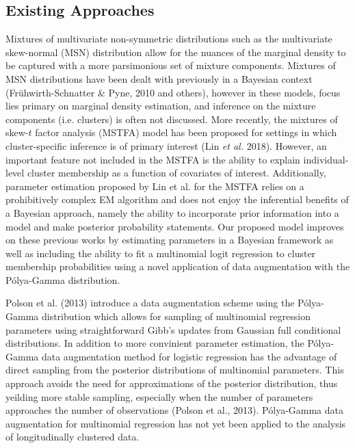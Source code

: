 \documentclass[useAMS,referee]{biom}
\begin{document}
\subsection{Existing Approaches}

Mixtures of multivariate non-symmetric distributions such as the multivariate skew-normal (MSN) distribution allow for the nuances of the marginal density to be captured with a more parsimonious set of mixture components. Mixtures of MSN distributions have been dealt with previously in a Bayesian context (Fr\"{u}hwirth-Schnatter \& Pyne, 2010 and others), however in these models, focus lies primary on marginal density estimation, and inference on the mixture components (i.e. clusters) is often not discussed. More recently, the mixtures of skew-$t$ factor analysis (MSTFA) model has been proposed for settings in which cluster-specific inference is of primary interest (Lin \textit{et al.} 2018). However, an important feature not included in the MSTFA is the ability to explain individual-level cluster membership as a function of covariates of interest. Additionally, parameter estimation proposed by Lin et al. for the MSTFA relies on a prohibitively complex EM algorithm and does not enjoy the inferential benefits of a Bayesian approach, namely the ability to incorporate prior information into a model and make posterior probability statements. Our proposed model improves on these previous works by estimating parameters in a Bayesian framework as well as including the ability to fit a multinomial logit regression to cluster membership probabilities using a novel application of data augmentation with the P\'olya-Gamma distribution.

Polson et al. (2013) introduce a data augmentation scheme using the P\'olya-Gamma distribution which allows for sampling of multinomial regression parameters using straightforward Gibb's updates from Gaussian full conditional distributions. In addition to more convinient parameter estimation, the P\'olya-Gamma data augmentation method for logistic regression has the advantage of direct sampling from the posterior distributions of multinomial parameters. This approach avoids the need for approximations of the posterior distribution, thus yeilding more stable sampling, especially when the number of parameters approaches the number of observations (Polson et al., 2013). P\'olya-Gamma data augmentation for multinomial regression has not yet been applied to the analysis of longitudinally clustered data. 
\end{document}

